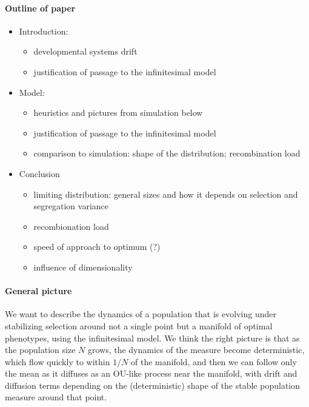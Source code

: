 \documentclass{article}
\begin{document}
\paragraph{Outline of paper}

\begin{itemize}

    \item  Introduction:
\begin{itemize}
        \item developmental systems drift
        \item justification of passage to the infinitesimal model
\end{itemize}

    \item Model:
\begin{itemize}
        \item heuristics and pictures from simulation below
        \item justification of passage to the infinitesimal model
        \item comparison to simulation: shape of the distribution; recombination load
    \end{itemize}

    \item Conclusion
\begin{itemize}
        \item limiting distribution: general sizes and how it depends on selection and segregation variance
        \item recombionation load
        \item speed of approach to optimum (?)
        \item influence of dimensionality
    \end{itemize}

\end{itemize}



\paragraph{General picture}
We want to describe the dynamics of a population that is evolving under stabilizing selection around not a single point but a manifold
of optimal phenotypes, using the infinitesimal model.
We think the right picture is that as the population size $N$ grows,
the dynamics of the measure become deterministic,
which flow quickly to within $1/N$ of the manifold,
and then we can follow only the mean as it diffuses as an OU-like process
near the manifold,
with drift and diffusion terms depending on the (deterministic) shape of the stable population measure
around that point.
\end{document}
